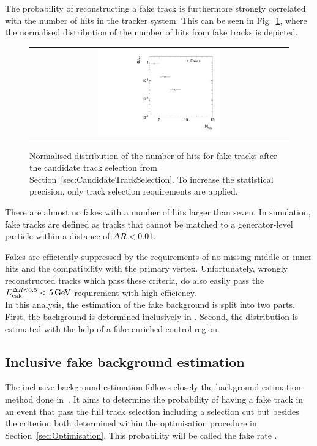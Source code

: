 The probability of reconstructing a fake track is furthermore strongly correlated with the number of hits in the tracker system.
This can be seen in Fig.~\ref{fig:NValidFakes}, where the normalised distribution of the number of hits from fake tracks is depicted.
\begin{figure}[!t]
  \centering 
  \begin{tabular}{c}
    \includegraphics[width=0.49\textwidth]{figures/analysis/Background/NValidForFakes_chiTracksfullSelectionNoTriggerCuts.pdf}
  \end{tabular}
  \caption{Normalised distribution of the number of hits for fake tracks after the candidate track selection from Section~\ref{sec:CandidateTrackSelection}.
           To increase the statistical precision, only track selection requirements are applied.}
  \label{fig:NValidFakes}
\end{figure}
There are almost no fakes with a number of hits larger than seven.
In simulation, fake tracks are defined as tracks that cannot be matched to a generator-level particle within a distance of $\Delta R < 0.01$.

Fakes are efficiently suppressed by the requirements of no missing middle or inner hits and the compatibility with the primary vertex.
Unfortunately, wrongly reconstructed tracks which pass these criteria, do also easily pass the $E^{\Delta R<0.5}_{\text{calo}}<5\,\text{Ge}\kern-0.06667em\text{V}$ requirement with high efficiency.\\

In this analysis, the estimation of the fake background is split into two parts.
First, the background is determined inclusively in \ias.
Second, the \ias distribution is estimated with the help of a fake enriched control region.

\subsection*{Inclusive fake background estimation}
The inclusive background estimation follows closely the background estimation method done in~\cite{bib:CMS:DT_Thesis,bib:CMS:DT_8TeV_AN}.
It aims to determine the probability of having a fake track in an event that pass the full track selection including a \pt selection cut but besides the \ias criterion both determined within the optimisation procedure in Section~\ref{sec:Optimisation}.
This probability will be called the fake rate \fakerate.

